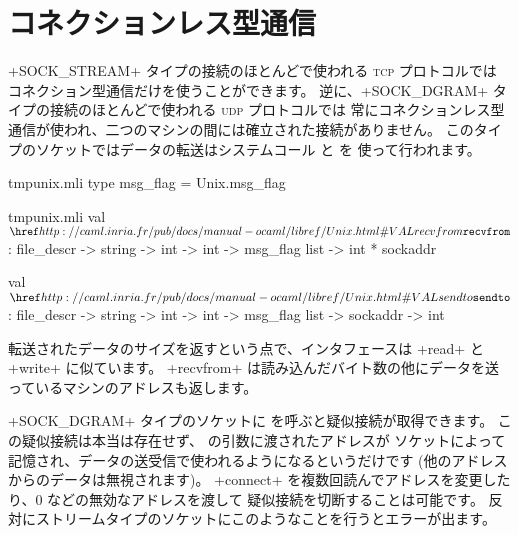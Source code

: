 \section{\label{sec/mode-deconnecte}コネクションレス型通信}

\ml+SOCK_STREAM+ タイプの接続のほとんどで使われる \textsc{tcp} プロトコルでは
コネクション型通信だけを使うことができます。
逆に、\ml+SOCK_DGRAM+ タイプの接続のほとんどで使われる \textsc{udp} プロトコルでは
常にコネクションレス型通信が使われ、二つのマシンの間には確立された接続がありません。
このタイプのソケットではデータの転送はシステムコール  と  を
使って行われます。
%
\begin{codefile}{tmpunix.mli}
type msg_flag = Unix.msg_flag
\end{codefile}
%
\begin{listingcodefile}{tmpunix.mli}
val $\libvalue{Unix}{recvfrom}$ :
  file_descr -> string -> int -> int -> msg_flag list -> int * sockaddr

val $\libvalue{Unix}{sendto}$ :
  file_descr -> string -> int -> int -> msg_flag list -> sockaddr -> int
\end{listingcodefile}
%
転送されたデータのサイズを返すという点で、インタフェースは \ml+read+ と \ml+write+ に似ています。
\ml+recvfrom+ は読み込んだバイト数の他にデータを送っているマシンのアドレスも返します。

\ml+SOCK_DGRAM+ タイプのソケットに  を呼ぶと疑似接続が取得できます。
この疑似接続は本当は存在せず、  の引数に渡されたアドレスが
ソケットによって記憶され、データの送受信で使われるようになるというだけです (他のアドレスからのデータは無視されます)。
\ml+connect+ を複数回読んでアドレスを変更したり、0 などの無効なアドレスを渡して
疑似接続を切断することは可能です。
反対にストリームタイプのソケットにこのようなことを行うとエラーが出ます。

